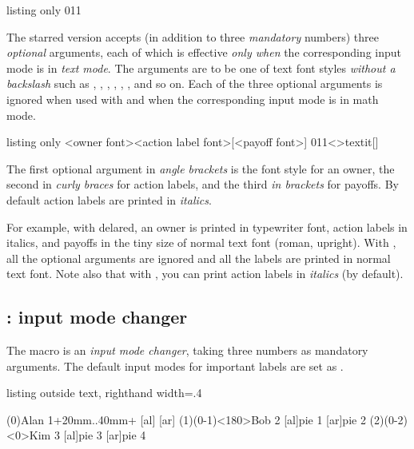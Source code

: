 \begin{tcblisting}{listing only}
  {0}{1}{1} 
\end{tcblisting}

The starred version \icmd{\setistmathTF*} accepts (in addition to three \emph{mandatory} numbers) three \emph{optional} arguments, each of which is effective \emph{only when} the corresponding input mode is in \emph{text mode}.
The arguments are to be one of text font styles \emph{without a backslash} such as , , , , , , and so on.
Each of the three optional arguments is ignored when used with \cmd{\setistmathTF} and when the corresponding input mode is in math mode.

\begin{tcblisting}{listing only}
  \setistmathTF{}{}{}<owner font>{<action label font>}[<payoff font>]
  {0}{1}{1}<>{textit}[]
\end{tcblisting}

The first optional argument in \emph{angle brackets} is the font style for an owner, the second in \emph{curly braces} for action labels, and the third \emph{in brackets} for payoffs. By default action labels are printed in \emph{italics}.

For example, with  delared, an owner is printed in typewriter font, action labels in italics, and payoffs in the tiny size of normal text font (roman, upright).
With , all the optional arguments are ignored and all the labels are printed in normal text font.
Note also that with , you can print action labels in \emph{italics} (by default).

\subsection{\protect\cmd{\setistmathTF}: input mode changer}

The macro \cmd{\setistmathTF} is an \emph{input mode changer}, taking three numbers as mandatory arguments.
The default input modes for important labels are set as .

\begin{tcblisting}{listing outside text, righthand width=.4\linewidth}
\begin{istgame}
\xtdistance{20mm}{20mm}
\istroot(0){Alan 1}+20mm..40mm+
  [al]
  [ar]         \endist
{} %
\istroot(1)(0-1)<180>{Bob 2}
  [al]{pie 1}
  [ar]{pie 2}  \endist
{} %
\istroot(2)(0-2)<0>{Kim 3}
  [al]{pie 3}
  [ar]{pie 4}  \endist
\end{istgame}
\end{tcblisting}


